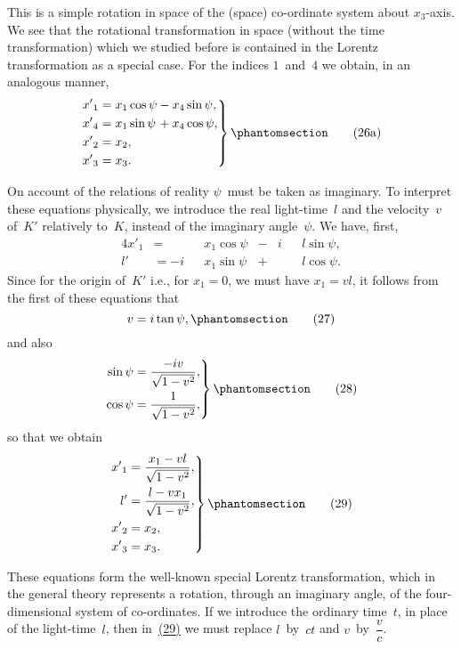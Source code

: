 \documentclass[12pt]{book}[2005/09/16]
\newcommand{\Change}[2]{#2}
\newcommand{\Add}[1]{\Change{}{#1}}
\newcommand{\PageSep}[1]{\ignorespaces}
\newcommand{\Tag}[1]{%
  \phantomsection
  \label{eqn:#1}
  \tag*{#1}
}
\newcommand{\Eqref}[1]{\hyperref[eqn:#1]{#1}}
\begin{document}
This is a simple rotation in space of the (space)
co-ordinate system about $x_{3}$-axis. We see that the
rotational transformation in space (without the time
transformation) which we studied before is contained in
the Lorentz transformation as a special case. For the
indices $1$~and~$4$ we obtain, in an analogous manner,
\[
\left.
\begin{alignedat}{2}
{x'}_{1} &= x_{1} \cos\psi &&- x_{4} \sin\psi\Add{,} \\
{x'}_{4} &= x_{1} \sin\psi &&+ x_{4} \cos\psi\Add{,} \\
{x'}_{2} &= x_{2}\Add{,} && \\
{x'}_{3} &= x_{3}\Add{.} &&
\end{alignedat}
\right\}
\Tag{(26a)}
\]

On account of the relations of reality $\psi$~must be taken
as imaginary. To interpret these equations physically,
we introduce the real light-time~$l$ and the velocity~$v$ of~$K'$
\PageSep{37}
relatively to~$K$, instead of the imaginary angle~$\psi$. We
have, first,
\begin{alignat*}{4}
{x'}_{1} &= &&x_{1} \cos\psi &{}-{}& i&&l \sin \psi\Add{,} \\
l'     &= -i&&x_{1} \sin\psi &{}+{}&  &&l \cos\psi.
\end{alignat*}
Since for the origin of~$K'$ i.e., for $x_{1} = 0$, we must have
$x_{1} = vl$, it follows from the first of these equations that
\[
v = i\tan\psi\Add{,}
\Tag{(27)}
\]
and also
\[
\left.
\begin{aligned}
\sin\psi &= \frac{-iv}{\sqrt{1 - v^{2}}}\Add{,} \\
\cos\psi &= \frac{1}{\sqrt{1 - v^{2}}}\Add{,}
\end{aligned}
\right\}
\Tag{(28)}
\]
so that we obtain
\[
\left.
\begin{aligned}
{x'}_{1} &= \frac{x_{1} - vl}{\sqrt{1 - v^{2}}}\Add{,} \\
l' &= \frac{l - vx_{1}}{\sqrt{1 - v^{2}}}\Add{,} \\
{x'}_{2} &= x_{2}\Add{,} \\
{x'}_{3} &= x_{3}\Add{.}
\end{aligned}
\right\}
\Tag{(29)}
\]

These equations form the well-known special Lorentz
transformation, which in the general theory represents a
rotation, through an imaginary angle, of the four-dimensional
system of co-ordinates. If we introduce the ordinary
time~$t$, in place of the light-time~$l$, then in~\Eqref{(29)} we must
replace $l$~by~$ct$ and $v$~by~$\dfrac{v}{c}$.
\end{document}
